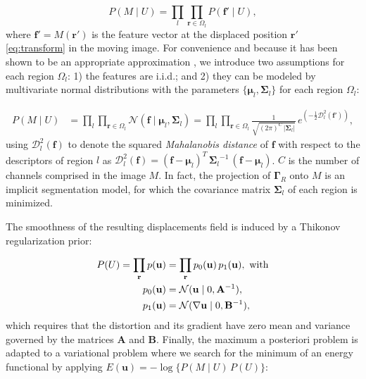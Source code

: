 \documentclass[3p,authoryear,fleqn]{elsarticle}
\providecommand{\mdist}[2]{ \mathcal{D}_{#2}^2(\mathbf{#1}) }
\providecommand{\gammaset}{\ensuremath{\boldsymbol{\Gamma}}}
\renewcommand{\vec}[1]{\mathbf{#1}}
\begin{document}
  \begin{equation}
  P(M \mid U) = \underset{l}{\prod} \underset{\vec{r}\in \Omega_l}{\prod}
    P\left( \vec{f}' \mid U \right),
  \label{eq:bayes_aposteriori}
  \end{equation}
  where $\vec{f}' = M(\vec{r}')$ is the feature vector at the displaced
  position $\vec{r}'$ \eqref{eq:transform} in the moving image.
For convenience and because it has been shown to be an appropriate approximation
  \citep{leemput_automated_1999,cuadra_comparison_2005}, we introduce two assumptions for each
  region $\Omega_l$:
  1) the features are i.i.d.; and 2) they can be modeled by multivariate normal
  distributions with the parameters $\lbrace \boldsymbol{\mu}_l, \boldsymbol{\Sigma}_{l} \rbrace$
  for each region $\Omega_l$:

  \begin{align}
  P( M \mid U) &= \underset{l}{\prod} \underset{\vec{r} \in \Omega_l}{\prod}
  \mathcal{N} ( \vec{f} \mid \boldsymbol{\mu}_l, \boldsymbol{\Sigma}_{l} ) =   \underset{l}{\prod} \underset{\vec{r} \in \Omega_l}{\prod} \frac{1}{ \sqrt{(2\pi)^{C}\,\left|\boldsymbol{\Sigma}_{l}\right|}}\,{e^{\left(-\frac{1}{2}
  \mdist{f'}{l} \right)}},
  \label{eq:pdf}
  \end{align}
  using $\mdist{f}{l}$ to denote the squared \emph{Mahalanobis distance} of $\vec{f}$ with respect
  to the descriptors of region $l$ as
  $\mdist{f}{l} = (\vec{f} - \boldsymbol{\mu}_l)^T \, {\boldsymbol{\Sigma}_l}^{-1} \, (\vec{f} - \boldsymbol{\mu}_l)$.
$C$ is the number of channels comprised in the image $M$.
In fact, the projection of $\gammaset_R$ onto $M$ is an implicit segmentation model, for which
  the covariance matrix $\boldsymbol{\Sigma}_l$ of each region is minimized.

The smoothness of the resulting displacements field is induced by a Thikonov regularization
  prior:

  \begin{align}
  P(U) = \underset{\vec{r}}{\prod}\, p(\vec{u}) &=
  \underset{\vec{r}}{\prod}\, p_0(\vec{u}) \, p_1(\vec{u}), \text{ with} \\
  p_0(\vec{u}) &= \mathcal{N}( \vec{u} \mid 0, \mathbf{A}^{-1}), \notag\\
  p_1(\vec{u}) &= \mathcal{N}(  \nabla \vec{u} \mid 0, \mathbf{B}^{-1}),
  \label{eq:thikonov}
  \end{align}
 which requires that the distortion and its gradient have zero
  mean and variance governed by the matrices $\mathbf{A}$ and $\mathbf{B}$.
Finally, the maximum a posteriori problem is adapted to a variational problem where we search for
  the minimum of an energy functional by applying $E(\vec{u}) = -\log \{P( M \mid U) \, P(U)\}$:
\end{document}
